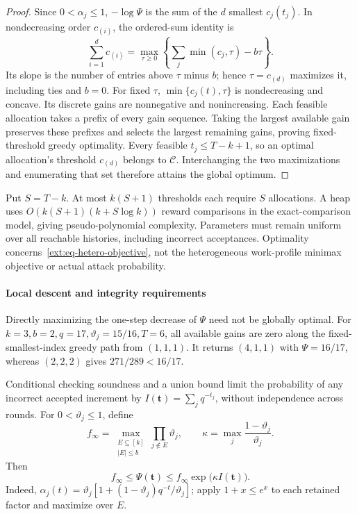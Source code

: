 \begin{proof}
Since $0<\alpha_j\le1$, $-\log\Psi$ is the sum of the $d$ smallest
$c_j(t_j)$. In nondecreasing order $c_{(i)}$, the ordered-sum identity is
\begin{equation}
\sum_{i=1}^{d}c_{(i)}=
\max_{\tau\ge0}\left\{\sum_j\min(c_j,\tau)-b\tau\right\}.
\label{ext:eq-ordered-sum}
\end{equation}
Its slope is the number of entries above $\tau$ minus $b$; hence
$\tau=c_{(d)}$ maximizes it, including ties and $b=0$.
For fixed $\tau$, $\min\{c_j(t),\tau\}$ is nondecreasing and concave.
Its discrete gains are nonnegative and nonincreasing. Each feasible
allocation takes a prefix of every gain sequence. Taking the largest
available gain preserves these prefixes and selects the largest remaining
gains, proving fixed-threshold greedy optimality.
Every feasible $t_j\le T-k+1$, so an optimal allocation's threshold
$c_{(d)}$ belongs to $\mathcal C$. Interchanging the two maximizations and
enumerating that set therefore attains the global optimum.
\end{proof}

Put $S=T-k$. At most $k(S+1)$ thresholds each require $S$ allocations.
A heap uses $O(k(S+1)(k+S\log k))$ reward comparisons in the
exact-comparison model, giving pseudo-polynomial complexity.
Parameters must remain uniform over all reachable histories, including
incorrect acceptances. Optimality concerns~\eqref{ext:eq-hetero-objective},
not the heterogeneous work-profile minimax objective or actual attack probability.


\paragraph{Local descent and integrity requirements}
Directly maximizing the one-step decrease of $\Psi$ need not be globally
optimal. For $k=3,b=2,q=17,\vartheta_j=15/16,T=6$, all available gains
are zero along the fixed-smallest-index greedy path from $(1,1,1)$.
It returns $(4,1,1)$ with $\Psi=16/17$, whereas $(2,2,2)$ gives
$271/289<16/17$.

Conditional checking soundness and a union bound limit the probability
of any incorrect accepted increment by $I(\mathbf t)=\sum_jq^{-t_j}$,
without independence across rounds. For $0<\vartheta_j\le1$, define
\[
 f_\infty=\max_{\substack{E\subseteq[k]\\|E|\le b}}
               \prod_{j\notin E}\vartheta_j,
 \qquad \kappa=\max_j\frac{1-\vartheta_j}{\vartheta_j}.
\]
Then
\begin{equation}\label{eq:integrity-work-link}
 f_\infty\le\Psi(\mathbf t)
       \le f_\infty\exp\!\bigl(\kappa I(\mathbf t)\bigr).
\end{equation}
Indeed, $\alpha_j(t)=\vartheta_j[1+(1-\vartheta_j)q^{-t}/\vartheta_j]$;
apply $1+x\le e^x$ to each retained factor and maximize over $E$.

